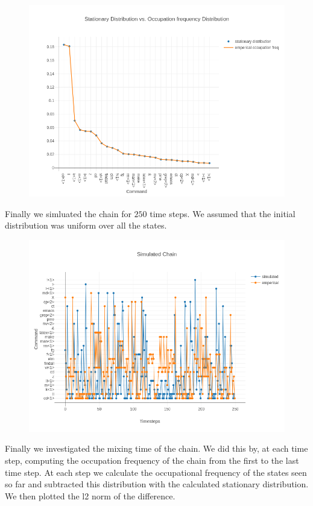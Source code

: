 \documentclass[10pt]{article}
\begin{document}
\begin{figure}[ht]
  \centering
  \includegraphics[scale=.65]{../pictures/stat-dist-and-emperical-occ-freq-dist.png}
\end{figure}

Finally we simluated the chain for $250$ time steps. We assumed that the initial
distribution was uniform over all the states.

\begin{figure}[ht]
  \centering
  \includegraphics[scale=.65]{../pictures/simul-chain-vs-emperical-chain.png}
\end{figure}

Finally we investigated the mixing time of the chain. We did this by, at each
time step, computing the occupation frequency of the chain from the first to the
last time step. At each step we calculate the occupational frequency of the
states seen so far and subtracted this distribution with the calculated
stationary distribution. We then plotted the l2 norm of the difference.
\end{document}

